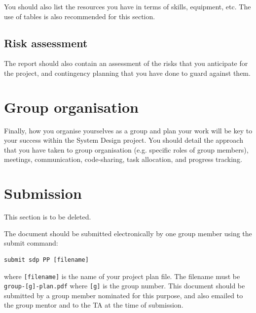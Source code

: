 \documentclass{article}
\begin{document}
You should also list the resources you have in terms of skills, equipment, etc. The use of tables is also recommended for this section.

\subsection{Risk assessment} 
The report should also contain an assessment of the risks that you anticipate for the project, and contingency planning that you have done to guard against them. 

\section{Group organisation}
Finally, how you organise yourselves as a group and plan your work will be key to your success within the System Design project. You should detail the approach that you have taken to group organisation (e.g. specific roles of group members), meetings, communication, code-sharing, task allocation, and progress tracking.

\section*{Submission}
This section is to be deleted.

The document should be submitted electronically by one group member using the submit command: 
\begin{verbatim}
submit sdp PP [filename] 
\end{verbatim}

where \verb|[filename]| is the name of your project plan file. The filename must be  \verb|group-[g]-plan.pdf| where \verb|[g]| is the group number.
This document should be submitted by a group member nominated for this purpose, and also emailed to the group mentor and to the TA at the time of submission.



\end{document}
